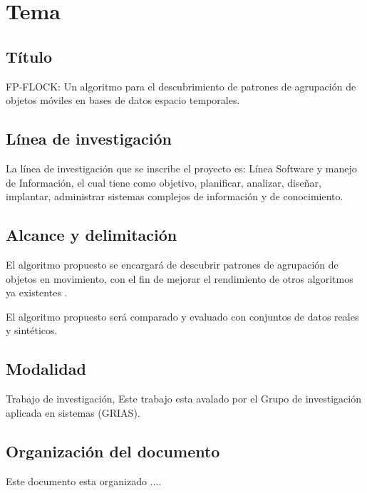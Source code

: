 \chapter{Tema}

\section{Título}

FP-FLOCK: Un algoritmo para el descubrimiento de patrones de agrupación de objetos móviles en bases de
datos espacio temporales.

\section{Línea de investigación}

La línea de investigación que se inscribe el proyecto es: Línea Software y manejo de Información, el cual tiene como objetivo,
planificar, analizar, diseñar, implantar, administrar sistemas complejos de información y de conocimiento. 

\section{Alcance y delimitación}

El algoritmo propuesto se encargará de descubrir patrones de agrupación de objetos en movimiento, con el fin de 
 mejorar el rendimiento de otros algoritmos ya existentes \cite{romero2011mining} \cite{vieira2009line}. 

El algoritmo propuesto será comparado y evaluado con conjuntos de datos reales y sintéticos.

\section{Modalidad}

Trabajo de investigación, Este trabajo esta avalado por el Grupo de investigación aplicada en 
sistemas (GRIAS).

\section{Organización del documento}

Este documento esta organizado ....